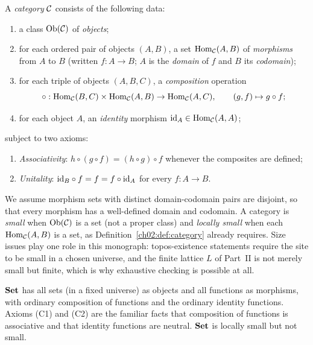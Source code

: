 \begin{definition}[Category]\label{ch02:def:category}
A \emph{category} $\mathcal{C}$ consists of the following data:
\begin{enumerate}
\item a class $\mathrm{Ob}(\mathcal{C})$ of \emph{objects};
\item for each ordered pair of objects $(A, B)$, a set
$\mathrm{Hom}_{\mathcal{C}}(A, B)$ of \emph{morphisms} from $A$ to $B$ (written
$f : A \to B$; $A$ is the \emph{domain} of $f$ and $B$ its
\emph{codomain});
\item for each triple of objects $(A, B, C)$, a \emph{composition}
operation
\[
\circ : \mathrm{Hom}_{\mathcal{C}}(B, C) \times \mathrm{Hom}_{\mathcal{C}}(A, B) \to \mathrm{Hom}_{\mathcal{C}}(A, C),
\qquad (g, f) \mapsto g \circ f ;
\]
\item for each object $A$, an \emph{identity} morphism
$\mathrm{id}_A \in \mathrm{Hom}_{\mathcal{C}}(A, A)$;
\end{enumerate}
subject to two axioms:
\begin{enumerate}
\item[(C1)] \emph{Associativity}: $h \circ (g \circ f) = (h \circ g)
\circ f$ whenever the composites are defined;
\item[(C2)] \emph{Unitality}: $\mathrm{id}_B \circ f = f = f \circ \mathrm{id}_A$ for
every $f : A \to B$.
\end{enumerate}
\end{definition}

We assume morphism sets with distinct domain-codomain pairs are disjoint,
so that every morphism has a well-defined domain and codomain. A category
is \emph{small} when $\mathrm{Ob}(\mathcal{C})$ is a set (not a proper class) and
\emph{locally small} when each $\mathrm{Hom}_{\mathcal{C}}(A,B)$ is a set, as
Definition~\ref{ch02:def:category} already requires. Size issues play one
role in this monograph: topos-existence statements require the site to be
small in a chosen universe, and the finite lattice $L$ of Part~II is not
merely small but finite, which is why exhaustive checking is possible at
all.

\begin{example}\label{ch02:ex:set}
$\mathbf{Set}$ has all sets (in a fixed universe) as objects and all functions as
morphisms, with ordinary composition of functions and the ordinary
identity functions. Axioms (C1) and (C2) are the familiar facts that
composition of functions is associative and that identity functions are
neutral. $\mathbf{Set}$ is locally small but not small.
\end{example}

